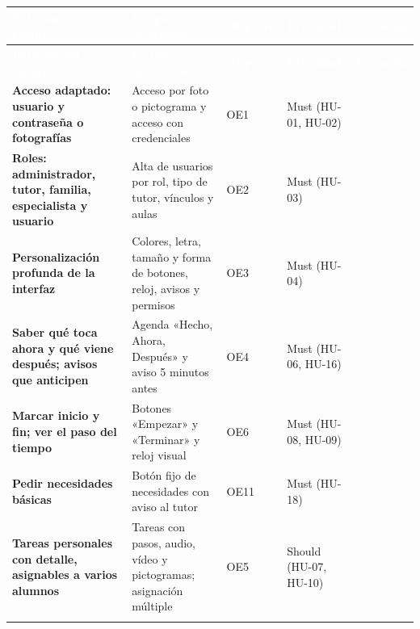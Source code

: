 \documentclass[11pt,a4paper]{article}
\newcommand{\hl}[1]{\textcolor{gblue}{\textbf{#1}}}
\begin{document}
{\small\setlength{\LTleft}{0pt}\setlength{\LTright}{0pt}
\begin{longtable}{@{}>{\raggedright\arraybackslash}p{}>{\raggedright\arraybackslash}p{}>{\raggedright\arraybackslash}p{}>{\raggedright\arraybackslash}p{}>{\raggedright\arraybackslash}p{}@{}}
\rowcolor{gblue}\textcolor{white}{\textbf{Petición del cliente}} & \textcolor{white}{\textbf{Lo que ofrecemos}} & \textcolor{white}{\textbf{Objetivo}} & \textcolor{white}{\textbf{Prioridad}} & \textcolor{white}{\textbf{Iteración}} \\
\endfirsthead
\rowcolor{gblue}\textcolor{white}{\textbf{Petición del cliente}} & \textcolor{white}{\textbf{Lo que ofrecemos}} & \textcolor{white}{\textbf{Objetivo}} & \textcolor{white}{\textbf{Prioridad}} & \textcolor{white}{\textbf{Iteración}} \\
\endhead
\hl{Acceso adaptado: usuario y contraseña o fotografías} & Acceso por foto o pictograma y acceso con credenciales & OE1 & Must (HU-01, HU-02) & 1 \\ \arrayrulecolor{gline}\hline
\rowcolor{glight}
\hl{Roles: administrador, tutor, familia, especialista y usuario} & Alta de usuarios por rol, tipo de tutor, vínculos y aulas & OE2 & Must (HU-03) & 1 \\ \arrayrulecolor{gline}\hline
\hl{Personalización profunda de la interfaz} & Colores, letra, tamaño y forma de botones, reloj, avisos y permisos & OE3 & Must (HU-04) & 1 \\ \arrayrulecolor{gline}\hline
\rowcolor{glight}
\hl{Saber qué toca ahora y qué viene después; avisos que anticipen} & Agenda «Hecho, Ahora, Después» y aviso 5 minutos antes & OE4 & Must (HU-06, HU-16) & 1 \\ \arrayrulecolor{gline}\hline
\hl{Marcar inicio y fin; ver el paso del tiempo} & Botones «Empezar» y «Terminar» y reloj visual & OE6 & Must (HU-08, HU-09) & 1 \\ \arrayrulecolor{gline}\hline
\rowcolor{glight}
\hl{Pedir necesidades básicas} & Botón fijo de necesidades con aviso al tutor & OE11 & Must (HU-18) & 1 \\ \arrayrulecolor{gline}\hline
\hl{Tareas personales con detalle, asignables a varios alumnos} & Tareas con pasos, audio, vídeo y pictogramas; asignación múltiple & OE5 & Should (HU-07, HU-10) & 2 \\ \arrayrulecolor{gline}\hline

\end{longtable}}
\end{document}
